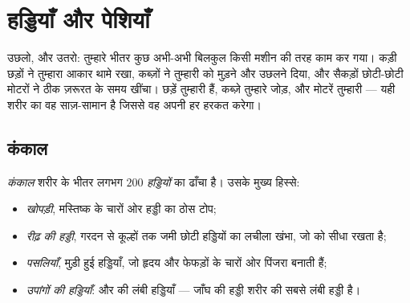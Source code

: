 \chapter{हड्डियाँ और पेशियाँ}\label{ch:g3:bones-and-muscles}

उछलो, और उतरो: तुम्हारे भीतर कुछ अभी-अभी बिलकुल किसी मशीन की तरह काम
कर गया। कड़ी छड़ों ने तुम्हारा आकार थामे रखा, कब्ज़ों ने तुम्हारी
 को मुड़ने और उछलने दिया, और सैकड़ों छोटी-छोटी मोटरों ने ठीक
ज़रूरत के समय खींचा। छड़ें तुम्हारी  हैं, कब्ज़े तुम्हारे जोड़,
और मोटरें तुम्हारी  --- यही शरीर का वह साज़-सामान है जिससे वह
अपनी हर हरकत करेगा।

\section{कंकाल}

\begin{definition}[कंकाल और हड्डियाँ]\label{def:g3:bones-and-muscles:skeleton}
\emph{कंकाल} शरीर के भीतर लगभग $200$
\emph{हड्डियों} का ढाँचा है। उसके मुख्य हिस्से:
\begin{itemize}
  \item \emph{खोपड़ी}, मस्तिष्क के चारों ओर हड्डी का
        ठोस टोप;
  \item \emph{रीढ़ की हड्डी}, गरदन से कूल्हों तक
        जमी छोटी हड्डियों का लचीला खंभा, जो  को सीधा रखता है;
  \item \emph{पसलियाँ}, मुड़ी हुई हड्डियाँ, जो हृदय और
        फेफड़ों के चारों ओर पिंजरा बनाती हैं;
  \item \emph{उपांगों की हड्डियाँ}:  और  की लंबी हड्डियाँ
        --- जाँघ की हड्डी शरीर की सबसे लंबी हड्डी है।
\end{itemize}
\end{definition}

